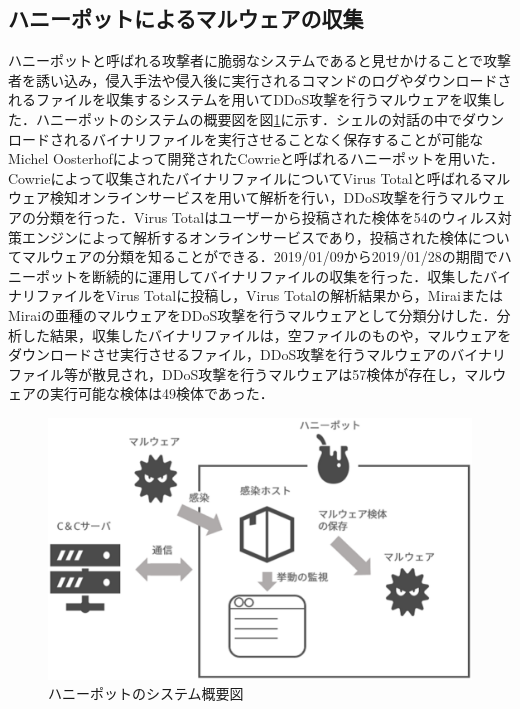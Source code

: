 \subsection{ハニーポットによるマルウェアの収集}
ハニーポットと呼ばれる攻撃者に脆弱なシステムであると見せかけることで攻撃者を誘い込み，侵入手法や侵入後に実行されるコマンドのログやダウンロードされるファイルを収集するシステムを用いてDDoS攻撃を行うマルウェアを収集した．ハニーポットのシステムの概要図を図\ref{fig:honey}に示す．シェルの対話の中でダウンロードされるバイナリファイルを実行させることなく保存することが可能なMichel Oosterhofによって開発されたCowrie\cite{Cowrie}と呼ばれるハニーポットを用いた．Cowrieによって収集されたバイナリファイルについてVirus Totalと呼ばれるマルウェア検知オンラインサービスを用いて解析を行い，DDoS攻撃を行うマルウェアの分類を行った．Virus Total\cite{Virus}はユーザーから投稿された検体を54のウィルス対策エンジンによって解析するオンラインサービスであり，投稿された検体についてマルウェアの分類を知ることができる．2019/01/09から2019/01/28の期間でハニーポットを断続的に運用してバイナリファイルの収集を行った．収集したバイナリファイルをVirus Totalに投稿し，Virus Totalの解析結果から，MiraiまたはMiraiの亜種のマルウェアをDDoS攻撃を行うマルウェアとして分類分けした．分析した結果，収集したバイナリファイルは，空ファイルのものや，マルウェアをダウンロードさせ実行させるファイル，DDoS攻撃を行うマルウェアのバイナリファイル等が散見され，DDoS攻撃を行うマルウェアは57検体が存在し，マルウェアの実行可能な検体は49検体であった．
\begin{figure}[h]
    \centering
       \includegraphics[width=120mm]{figures/honey.eps}
    \caption{ハニーポットのシステム概要図}
    \label{fig:honey}
\end{figure}

\newpage 

